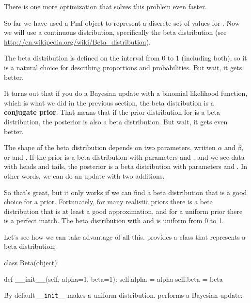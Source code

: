 \documentclass[12pt]{book}
\theoremstyle{exercise}
\begin{document}
There is one more optimization that solves this problem
even faster.

So far we have used a Pmf object to represent a discrete set of
values for .  Now we will use a continuous
distribution, specifically the beta distribution (see
\url{http://en.wikipedia.org/wiki/Beta_distribution}).

The beta distribution is defined on the interval from 0 to 1
(including both), so it is a natural choice for describing
proportions and probabilities.  But wait, it gets better.


It turns out that if you do a Bayesian update with a binomial
likelihood function, which is what we did in the previous section, the beta
distribution is a {\bf conjugate prior}.  That means that if the prior
distribution for  is a beta distribution, the posterior is also
a beta distribution.  But wait, it gets even better.

The shape of the beta distribution depends on two parameters, written
$\alpha$ and $\beta$, or  and .  If the prior
is a beta distribution with parameters  and , and
we see data with  heads and  tails, the posterior is a
beta distribution with parameters  and .  In
other words, we can do an update with two additions.

So that's great, but it only works if we can find a beta distribution
that is a good choice for a prior.  Fortunately, for many realistic
priors there is a beta distribution that is at least a good
approximation, and for a uniform prior there is a perfect match.  The
beta distribution with  and  is uniform from
0 to 1.

Let's see how we can take advantage of all this.  
 provides 
a class that represents a beta distribution:

\begin{code}
class Beta(object):

    def __init__(self, alpha=1, beta=1):
        self.alpha = alpha
        self.beta = beta
\end{code}

By default \verb"__init__" makes a uniform distribution.
 performs a Bayesian update:
\end{document}
